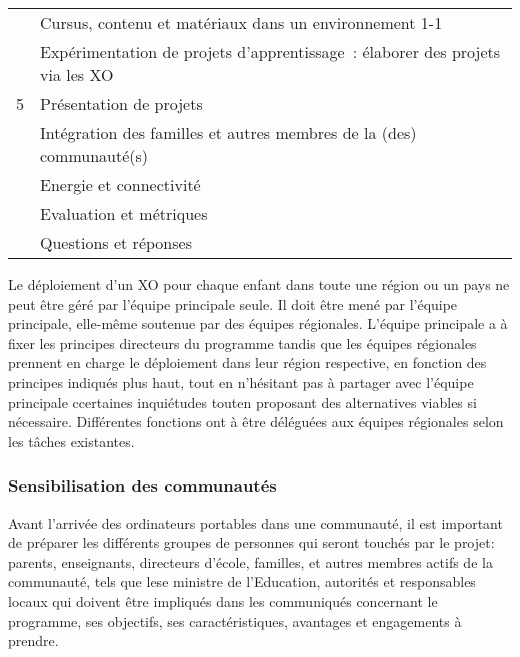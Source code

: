\documentclass[12pt]{article}
\begin{document}
\begin{table}[htb]
\begin{center}
\begin{tabular}{|l|l|}
       &  Cursus, contenu et matériaux dans un environnement 1-1                               \\
       &  Expérimentation de projets d’apprentissage : élaborer des projets via les XO         \\
\hline
    5  &  Présentation de projets                                                              \\
       &  Intégration des familles et autres membres de la (des) communauté(s)                 \\
       &  Energie et connectivité                                                              \\
       &  Evaluation et métriques                                                              \\
       &  Questions et réponses                                                                \\
\hline
\end{tabular}
\end{center}
\end{table}


Le déploiement d'un XO pour chaque enfant dans toute une région ou un pays
ne peut être géré par l'équipe principale seule. Il doit être mené par
l'équipe principale, elle-même soutenue par des équipes
régionales. L'équipe principale a à fixer les principes directeurs du
programme tandis que les équipes régionales prennent en charge le
déploiement dans leur région respective, en fonction des principes indiqués
plus haut, tout en n'hésitant pas à partager avec l'équipe principale
ccertaines inquiétudes  touten proposant des alternatives viables si
nécessaire. Différentes fonctions ont à être déléguées aux équipes
régionales selon les tâches existantes. 
\subsubsection{Sensibilisation des communautés}
\label{sec-9-3-2}




Avant l'arrivée des ordinateurs portables dans une communauté, il est
important de préparer les différents groupes de personnes qui seront
touchés par le projet: parents, enseignants, directeurs d'école, familles,
et autres membres actifs de la communauté, tels que lese ministre de
l'Education, autorités et responsables locaux qui doivent être impliqués
dans les communiqués  concernant le programme, ses objectifs, ses
caractéristiques, avantages et engagements à prendre. 
\end{document}
